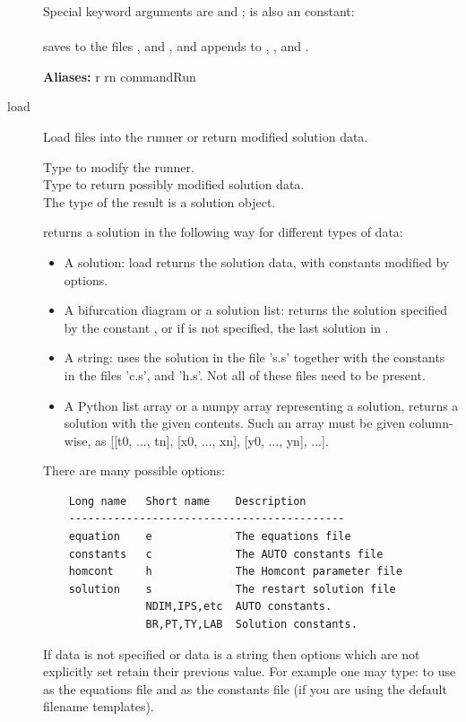 \documentclass[12pt]{report}
\begin{document}
\begin{description}
    Special keyword arguments are  and ;  is also an \AUTO
    constant:\\
    \\
    saves to the files ,  and ,
    and appends to , , and .

    \textbf{Aliases:} r rn commandRun

\item[load]
Load files into the \AUTO runner or return modified solution data.

    Type  to modify the \AUTO runner.\\
    Type  to return possibly
    modified solution data.\\

    The type of the result is a solution object.

     returns a solution in the following way for
    different types of data:
    \begin{itemize}
    \item
      A solution: load returns the solution data, with \AUTO constants
      modified by options.
    \item
      A bifurcation diagram or a solution list:
      returns the solution specified by
      the \AUTO constant , or if  is not specified, the last solution
      in .
    \item
      A string: \AUTO uses the solution in the file 's.s' together with the
      constants in the files 'c.s', and 'h.s'. Not all of these
      files need to be present.
    \item
      A Python list array or a numpy array representing a solution,
      returns a solution with the given contents. Such an array must be given
      column-wise, as [[t0, ..., tn], [x0, ..., xn], [y0, ..., yn], ...].
    \end{itemize}

    There are many possible options:
    \begin{verbatim}
    Long name   Short name    Description
    -------------------------------------------
    equation    e             The equations file
    constants   c             The AUTO constants file
    homcont     h             The Homcont parameter file
    solution    s             The restart solution file
                NDIM,IPS,etc  AUTO constants.
                BR,PT,TY,LAB  Solution constants.
    \end{verbatim}
    If data is not specified or data is a string then options which
    are not explicitly set retain their previous value.
    For example one may type:  to use  as
    the equations file and  as the constants file (if you are
    using the default filename templates).


\end{description}
\end{document}
